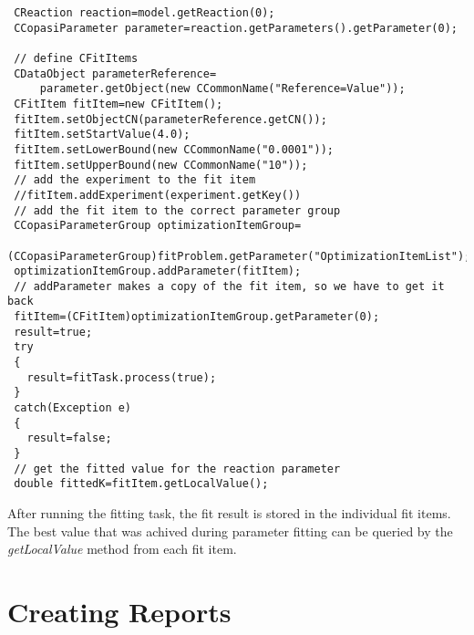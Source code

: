 \documentclass[a4,10pt]{article}
\begin{document}
\begin{lstlisting}
 CReaction reaction=model.getReaction(0);
 CCopasiParameter parameter=reaction.getParameters().getParameter(0);
 
 // define CFitItems
 CDataObject parameterReference=
     parameter.getObject(new CCommonName("Reference=Value"));
 CFitItem fitItem=new CFitItem();
 fitItem.setObjectCN(parameterReference.getCN());
 fitItem.setStartValue(4.0);
 fitItem.setLowerBound(new CCommonName("0.0001"));
 fitItem.setUpperBound(new CCommonName("10"));
 // add the experiment to the fit item
 //fitItem.addExperiment(experiment.getKey())
 // add the fit item to the correct parameter group
 CCopasiParameterGroup optimizationItemGroup=
     (CCopasiParameterGroup)fitProblem.getParameter("OptimizationItemList");
 optimizationItemGroup.addParameter(fitItem);
 // addParameter makes a copy of the fit item, so we have to get it back
 fitItem=(CFitItem)optimizationItemGroup.getParameter(0);
 result=true;
 try
 {
   result=fitTask.process(true);
 }
 catch(Exception e)
 {
   result=false;
 }
 // get the fitted value for the reaction parameter
 double fittedK=fitItem.getLocalValue();
\end{lstlisting}

After running the fitting task, the fit result is stored in the individual fit items. The best value that was achived during parameter fitting can be queried by the \textit{getLocalValue} method from each fit item.

\section{Creating Reports}
\label{CreatingReports}
\end{document}
